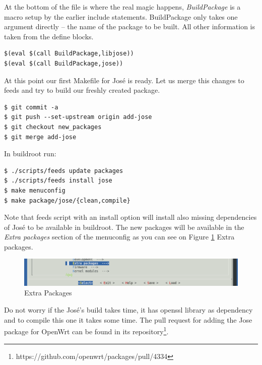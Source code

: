 At the bottom of the file is where the real magic happens, {\it BuildPackage} is a macro setup by the earlier include statements.
BuildPackage only takes one argument directly – the name of the package to be built.
All other information is taken from the define blocks.
\begin{lstlisting}[columns=fixed,basicstyle=\ttfamily\footnotesize,tabsize=4,backgroundcolor=\color{yellow!10}]
$(eval $(call BuildPackage,libjose))
$(eval $(call BuildPackage,jose))
\end{lstlisting}
At this point our first Makefile for José is ready.
Let us merge this changes to feeds and try to build our freshly created package.
\begin{lstlisting}[columns=fixed,basicstyle=\ttfamily\footnotesize,tabsize=4,backgroundcolor=\color{yellow!10}]
$ git commit -a
$ git push --set-upstream origin add-jose
$ git checkout new_packages
$ git merge add-jose
\end{lstlisting}
In buildroot run:
\begin{lstlisting}[columns=fixed,basicstyle=\ttfamily\footnotesize,tabsize=4,backgroundcolor=\color{yellow!10}]
$ ./scripts/feeds update packages
$ ./scripts/feeds install jose
$ make menuconfig
$ make package/jose/{clean,compile}
\end{lstlisting}
Note that feeds script with an install option will install also missing dependencies of José to be available in buildroot.
The new packages will be available in the {\it Extra packages} section of the menuconfig as you can see on Figure \ref{fig_extra} Extra packages.
\begin{figure}[h]
    \centering
    \includegraphics[scale=0.6]{figures/extra_packages.pdf}
    \caption{Extra Packages}
    \label{fig_extra}
\end{figure}
Do not worry if the José's build takes time, it has openssl library as dependency and to compile this one it takes some time.
The pull request for adding the Jose package for OpenWrt can be found in its repository\footnote{https://github.com/openwrt/packages/pull/4334}.
